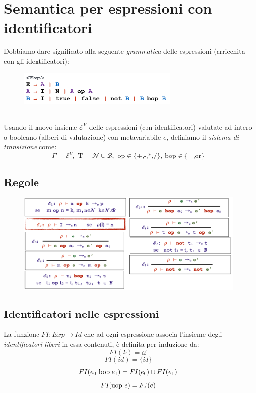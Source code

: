 \documentclass[a4paper,oneside,titlepage]{book}
\begin{document}
\newpage
\section{Semantica per espressioni con identificatori}
Dobbiamo dare significato alla seguente \textit{grammatica} delle espressioni (arricchita con gli identificatori):
\begin{figure}[htp]
	\centering
	\includegraphics[width=0.7\textwidth]{expId.png}
\end{figure}
\\
Usando il nuovo insieme $\mathcal{E}^V$ delle espressioni (con identificatori) valutate ad intero o booleano (alberi di valutazione) con metavariabile $e$, definiamo il \textit{sistema di transizione} come:
\[ \Gamma = \mathcal{E}^V, \text{ T} = \mathcal{N} \cup \mathcal{B}, \text{ op} \in \text{\{+,-,*,/\}, bop} \in \text{\{=,or\}} \]

\subsection{Regole}
\begin{figure}[htp]
	\centering
	\includegraphics[width=\textwidth]{expRegole2.png}
\end{figure}

\subsection{Identificatori nelle espressioni}
La funzione $FI: Exp \rightarrow Id$ che ad ogni espressione associa l'insieme degli \textit{identificatori liberi} in essa contenuti, è definita per induzione da:
\[ FI(k) = \varnothing \]
\[ FI(id) = \{id\} \]
\[ FI(e_0 \text{ \lstinline|bop| } e_1) = FI(e_0) \cup FI(e_1) \]
\[ FI(\text{\lstinline|uop| } e) = FI(e) \]
\end{document}
